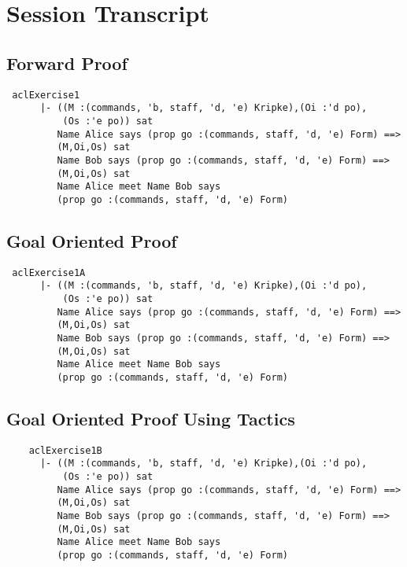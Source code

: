 \documentclass{report}
\begin{document}
\section{Session Transcript}
\label{13-1-trans}

\subsection{Forward Proof}
\label{op-forward-proof-13-1}
\begin{session}
  \begin{scriptsize}
\begin{verbatim}
 aclExercise1
      |- ((M :(commands, 'b, staff, 'd, 'e) Kripke),(Oi :'d po),
          (Os :'e po)) sat
         Name Alice says (prop go :(commands, staff, 'd, 'e) Form) ==>
         (M,Oi,Os) sat
         Name Bob says (prop go :(commands, staff, 'd, 'e) Form) ==>
         (M,Oi,Os) sat
         Name Alice meet Name Bob says
         (prop go :(commands, staff, 'd, 'e) Form)
\end{verbatim}
  \end{scriptsize}
\end{session}

\subsection{Goal Oriented Proof}
\label{op-goal-proof-13-1}
\begin{session}
  \begin{scriptsize}
\begin{verbatim}
 aclExercise1A
      |- ((M :(commands, 'b, staff, 'd, 'e) Kripke),(Oi :'d po),
          (Os :'e po)) sat
         Name Alice says (prop go :(commands, staff, 'd, 'e) Form) ==>
         (M,Oi,Os) sat
         Name Bob says (prop go :(commands, staff, 'd, 'e) Form) ==>
         (M,Oi,Os) sat
         Name Alice meet Name Bob says
         (prop go :(commands, staff, 'd, 'e) Form)
\end{verbatim}
  \end{scriptsize}
\end{session}

\subsection{Goal Oriented Proof Using Tactics}
\label{op-goal-proof-tacs-13-1}
\begin{session}
  \begin{scriptsize}
\begin{verbatim}
    aclExercise1B
      |- ((M :(commands, 'b, staff, 'd, 'e) Kripke),(Oi :'d po),
          (Os :'e po)) sat
         Name Alice says (prop go :(commands, staff, 'd, 'e) Form) ==>
         (M,Oi,Os) sat
         Name Bob says (prop go :(commands, staff, 'd, 'e) Form) ==>
         (M,Oi,Os) sat
         Name Alice meet Name Bob says
         (prop go :(commands, staff, 'd, 'e) Form)
\end{verbatim}
  \end{scriptsize}
\end{session}
\end{document}
